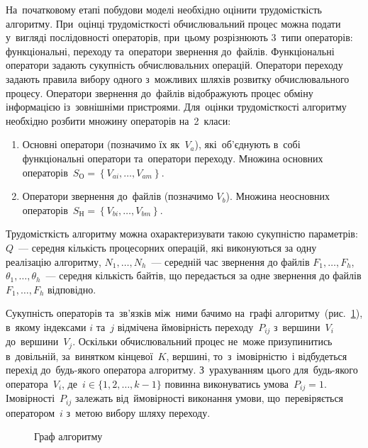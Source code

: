 \documentclass[
	a4paper,
	oneside,
	BCOR = 10mm,
	DIV = 12,
	12pt,
	headings = normal,
]{scrartcl}
\begin{document}
		На~початковому етапі побудови моделі необхідно оцінити трудомісткість алгоритму. При~оцінці трудомісткості обчислювальний процес можна подати у~вигляді послідовності операторів, при~цьому розрізнюють 3~типи операторів: функціональні, переходу та~оператори звернення до~файлів. Функціональні оператори задають сукупність обчислювальних операцій. Оператори переходу задають правила вибору одного з~можливих шляхів розвитку обчислювального процесу. Оператори звернення до~файлів відображують процес обміну інформацією із~зовнішніми пристроями. Для~оцінки трудомісткості алгоритму необхідно розбити множину операторів на~2~класи: 
		\begin{enumerate}[itemsep = 1\baselineskip]
			\item Основні оператори (позначимо їх як~$V_{a}$), які~об'\-єд\-ну\-ють в~собі функціональні оператори та~оператори переходу. Множина основних операторів~$S_{\text{О}} = \left\{V_{ai}, \dots, V_{am} \right\}$. 
			\item Оператори звернення до~файлів (позначимо $V_{b}$). Множина неосновних операторів~$S_{\text{Н}} = \left\{ V_{bi}, \dots, V_{bm} \right\}$. 
		\end{enumerate}
				
				Трудомісткість алгоритму можна охарактеризувати такою сукупністю параметрів: $Q$~— середня кількість процесорних операцій, які виконуються за одну реалізацію алгоритму, $N_1, \dots, N_{h}$~— середній час звернення до файлів $F_{1}, \dots, F_{h}$, $\theta_1, \dots, \theta_{h}$~— середня кількість байтів, що передається за одне звернення до файлів $F_{1}, \dots, F_{h}$ відповідно. 

		Сукупність операторів та~зв'яз\-ків між~ними бачимо на~графі алгоритму~(рис.~\ref{fig:graph-alg}), в~якому індексами $i$ та~$j$ відмічена ймовірність переходу~$P_{ij}$ з~вершини~$V_{i}$ до~вершини~$V_{j}$. Оскільки обчислювальний процес не~може призупинитись в~довільній, за~винятком кінцевої~$K$, вершині, то~з~імовірністю~$і$ відбудеться перехід до~будь-якого оператора алгоритму. З~урахуванням цього для~будь-якого оператора~$V_{i}$, де~$i \in \{1, 2, \dots, k-1\}$ повинна виконуватись умова~$P_{ij} = 1$. Імовірності~$P_{ij}$ залежать від~ймовірності виконання умови, що~перевіряється оператором~$i$ з~метою вибору шляху переходу.

		\begin{figure}[!htbp]
			\centering
			\caption{Граф алгоритму}
			\label{fig:graph-alg}
		\end{figure}
\end{document}
